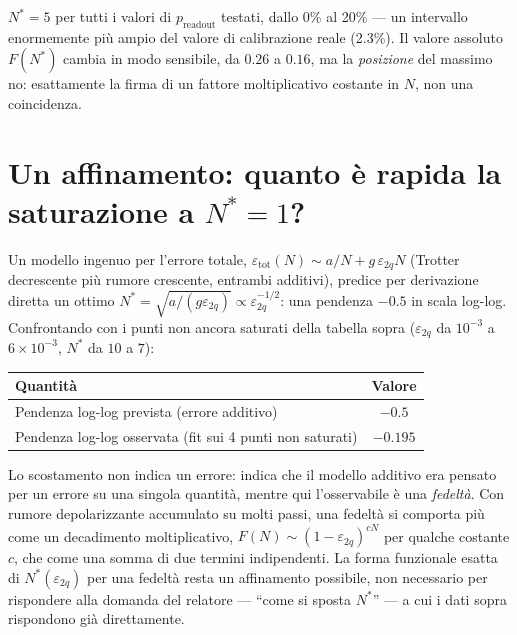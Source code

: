 \documentclass[11pt,a4paper]{article}
\begin{document}
$N^*=5$ per tutti i valori di $p_\text{readout}$ testati, dallo 0\% al 20\% ---
un intervallo enormemente più ampio del valore di calibrazione reale (2.3\%).
Il valore assoluto $F(N^*)$ cambia in modo sensibile, da $0.26$ a $0.16$, ma
la \emph{posizione} del massimo no: esattamente la firma di un fattore
moltiplicativo costante in $N$, non una coincidenza.


\section{Un affinamento: quanto è rapida la saturazione a $N^*=1$?}

Un modello ingenuo per l'errore totale, $\varepsilon_\text{tot}(N)\sim
a/N+g\,\varepsilon_{2q}N$ (Trotter decrescente più rumore crescente, entrambi
additivi), predice per derivazione diretta un ottimo
$N^*=\sqrt{a/(g\varepsilon_{2q})}\propto\varepsilon_{2q}^{-1/2}$: una pendenza
$-0.5$ in scala log-log. Confrontando con i punti non ancora saturati della
tabella sopra ($\varepsilon_{2q}$ da $10^{-3}$ a $6\times10^{-3}$, $N^*$ da
$10$ a $7$):

\begin{center}
\renewcommand{\arraystretch}{1.2}
\begin{tabular}{@{}lc@{}}
\toprule
Quantità & Valore\\
\midrule
Pendenza log-log prevista (errore additivo) & $-0.5$\\
Pendenza log-log osservata (fit sui 4 punti non saturati) & $-0.195$\\
\bottomrule
\end{tabular}
\end{center}

Lo scostamento non indica un errore: indica che il modello additivo era
pensato per un errore su una singola quantità, mentre qui l'osservabile è una
\emph{fedeltà}. Con rumore depolarizzante accumulato su molti passi, una
fedeltà si comporta più come un decadimento moltiplicativo,
$F(N)\sim(1-\varepsilon_{2q})^{cN}$ per qualche costante $c$, che come una
somma di due termini indipendenti. La forma funzionale esatta di
$N^*(\varepsilon_{2q})$ per una fedeltà resta un affinamento possibile, non
necessario per rispondere alla domanda del relatore --- ``come si sposta
$N^*$'' --- a cui i dati sopra rispondono già direttamente.
\end{document}
